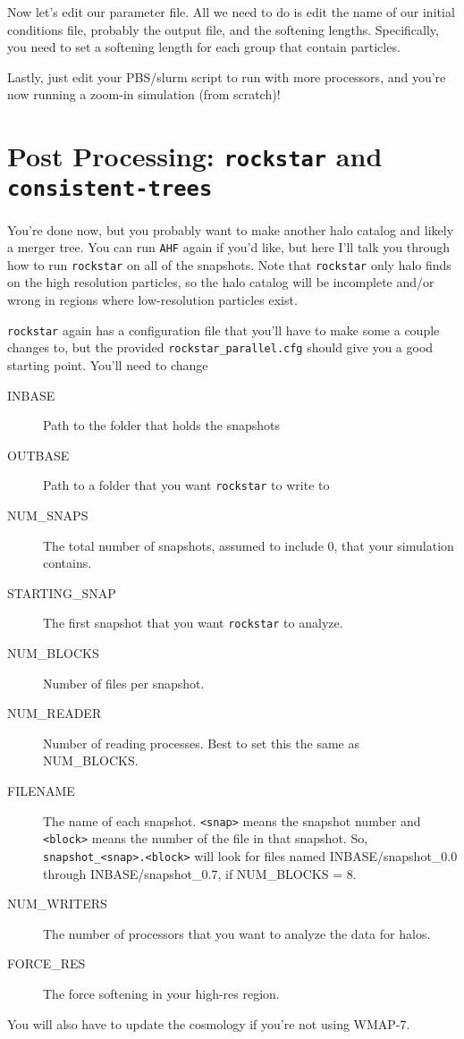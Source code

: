 \documentclass[10pt,a4paper,onecolumn]{article}
\begin{document}
Now let's edit our parameter file.  All we need to do is edit the name of our initial conditions
file, probably the output file, and the softening lengths.  Specifically, you need to set a
softening length for each group that contain particles.

Lastly, just edit your PBS/slurm script to run with more processors, and you're now running a zoom-in
simulation (from scratch)!

\section{Post Processing:   \texttt{rockstar} and \texttt{consistent-trees}}
You're done now, but you probably want to make another halo catalog and likely a merger tree.
You can run \texttt{AHF} again if you'd like, but here I'll talk you through how to run 
\texttt{rockstar} on all of the snapshots.  Note that  \texttt{rockstar} only halo finds on the high 
resolution particles, so the halo catalog will be incomplete and/or wrong in regions where 
low-resolution particles exist.

\texttt{rockstar} again has a configuration file that you'll have to make some a 
couple changes to, but the provided \texttt{rockstar\_parallel.cfg} should give
you a good starting point.  You'll need to change
\begin{description}
\item[INBASE] Path to the folder that holds the snapshots
\item[OUTBASE] Path to a folder that you want  \texttt{rockstar} to write to
\item[NUM\_SNAPS] The total number of snapshots, assumed to
include 0, that your simulation contains.
\item[STARTING\_SNAP] The first snapshot that you want  \texttt{rockstar} to analyze.
\item[NUM\_BLOCKS] Number of files per snapshot.
\item[NUM\_READER] Number of reading processes.  Best to set this
the same as NUM\_BLOCKS.
\item[FILENAME] The name of each snapshot.  \texttt{<snap>} means the snapshot 
number and \texttt{<block>} means the number of the file in that snapshot.  So, 
\texttt{snapshot\_<snap>.<block>} will look for files named 
INBASE/snapshot\_0.0 through INBASE/snapshot\_0.7, if NUM\_BLOCKS = 8.
\item[NUM\_WRITERS] The number of processors that you want to 
analyze the data for halos.
\item [FORCE\_RES] The force softening in your high-res region.
\end{description}
You will also have to update the cosmology if you're not using
WMAP-7.
\end{document}
